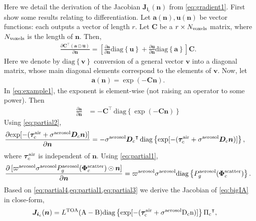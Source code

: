 \documentclass[10pt,letterpaper]{article}
\newcommand{\OpDistance}{\bm{D}}
\newcommand{\OpDiag}[1]{\mathrm{diag}\left\{#1\right\}}
\newcommand{\abbrev}[1]{\rm{#1}}
\newcommand{\PartDeriv}[2]{\frac{\partial{#1}}{\partial{#2}}}
\newcommand{\vect}[1]{\bm{#1}}
\newcommand{\mat}[1]{\bm{#1}}
\newcommand{\transpose}[1]{{#1}^\intercal}
\begin{document}
Here we detail the derivation of the Jacobian ${\bm J}_{{\bm i}_c}({\bm n})$ from \cref{eq:gradient1}. First show some results relating to differentiation.  Let
$\vect{a}(\vect{n}),\vect{u}(\vect{n})$ be vector functions: each outputs a vector of
length $r$. Let $\mat{C}$ be a $r \times N_{\rm voxels}$ matrix, where $N_{\rm voxels}$ is the length of ${\bm n}$.
Then,
\begin{align}
  \label{eq:partial1}
  \PartDeriv{\transpose{\mat{C}} (\vect{a} \odot \vect{u})}{\vect{n}}
  = \left[ \PartDeriv{\vect{a}}{\vect{n}} \OpDiag{\vect{u}} +
    \PartDeriv{\vect{u}}{\vect{n}} \OpDiag{\vect{a}} \right] \mat{C}.
\end{align}
Here we denote by $\OpDiag{\vect{v}}$ conversion of a general vector $\vect{v}$
into a diagonal matrix, whose main diagonal elements correspond to the
elements of $\vect{v}$. Now, let
\begin{align}
  \vect{a}(\vect{n}) = \exp(-{\mat{C}}\vect{n}).
  \label{eq:example1}
\end{align}
In \cref{eq:example1}, the exponent is element-wise (not raising an
operator to some power). Then
\begin{align}
  \label{eq:partial2}
  \PartDeriv{\vect{a}}{\vect{n}} &= - \transpose{\mat{C}} \,
  \OpDiag{\exp(-{\mat{C}}\vect{n})}
\end{align}
Using \cref{eq:partial2},
\begin{align}
  \label{eq:partial4}
  \PartDeriv{\exp[-(\vect{\tau}_c^{\rm air} + {\sigma}^{\rm aerosol}{\bm D}_c {\bm n})]}
  {\vect{n}} &= - {\sigma}^{\rm aerosol}\transpose{\OpDistance_c} \,
  \OpDiag{\exp[-(\vect{\tau}_c^{\rm air} + {\sigma}^{\rm aerosol}{\bm D}_c {\bm n})]},
\end{align}
where $\vect{\tau}_c^{\rm air}$ is independent of ${\bm n}$. Using \cref{eq:partial1},
\begin{align}
  \label{eq:partial3}
  \PartDeriv{\, [\varpi^{\rm aerosol}\sigma^{\rm aerosol} P^{\rm
      aerosol}_g(\vect{\Phi}^{\rm scatter}_c) \odot{\bm n}]}{\vect{n}}
  =
  \varpi^{\rm aerosol}\sigma^{\rm aerosol}\OpDiag{P^{\rm
      aerosol}_g(\vect{\Phi}^{\rm scatter}_c)}.
\end{align}
Based on \cref{eq:partial4,eq:partial1,eq:partial3} we derive the Jacobian of \cref{eq:bigIA}
in close-form,
\begin{align}
  {\bm J}_{{\bm i}_c}({\bm n}) &= L^{\rm TOA}(\abbrev{A}-\abbrev{B})
  \OpDiag{\exp[-(\vect{\tau}_c^{\rm air} + {\sigma}^{\rm
      aerosol} {\bm D}_c {\bm n})]} \transpose{{\vect{\Pi}}_c}
   ,
  \label{eq:gradient2}
\end{align}
\end{document}
